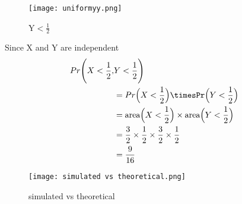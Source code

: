 \documentclass[11pt,a4paper,twocolumn]{article}
\begin{document}
\begin{figure}[h!]
    \centering
    \texttt{[image: uniformyy.png]}
    \caption{Y$<\frac{1}{2}$}
    \label{fig:my_label}
\end{figure}
\newpage
Since X and Y are independent
\begin{align*}
    Pr\Bigg(X<\frac{1}{2},&Y<\frac{1}{2}\Bigg)\\
    &=Pr\Big(X<\frac{1}{2}\Big)\timesPr\Big(Y<\frac{1}{2}\Big)\\
    &=\text{area}\Big(X<\frac{1}{2}\Big)\times \text{area}\Big(Y<\frac{1}{2}\Big)\\
   &=\frac{3}{2}\times\frac{1}{2}\times\frac{3}{2}\times\frac{1}{2}\\
    &=\frac{9}{16}
\end{align*}
\begin{figure}[h!]
    \centering
    \texttt{[image: simulated vs theoretical.png]}
    \caption{simulated vs theoretical}
    \label{fig:my_label}
\end{figure}
\end{document}
